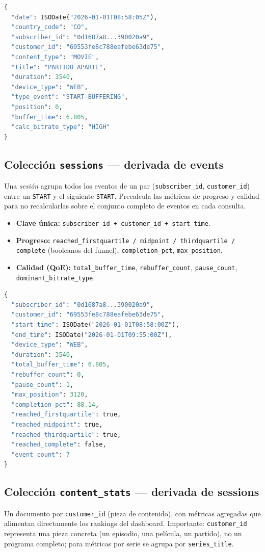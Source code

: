 \documentclass[12pt, letterpaper]{article}
\newcommand{\code}[1]{\texttt{#1}}
\begin{document}
\begin{lstlisting}[language=Python,caption={Documento de ejemplo en \code{events}}]
{
  "date": ISODate("2026-01-01T08:58:05Z"),
  "country_code": "CO",
  "subscriber_id": "0d1687a8...390020a9",
  "customer_id": "69553fe8c788eafebe63de75",
  "content_type": "MOVIE",
  "title": "PARTIDO APARTE",
  "duration": 3540,
  "device_type": "WEB",
  "type_event": "START-BUFFERING",
  "position": 0,
  "buffer_time": 6.805,
  "calc_bitrate_type": "HIGH"
}
\end{lstlisting}

\subsection{Colección \code{sessions} — derivada de events}
Una \emph{sesión} agrupa todos los eventos de un par
(\code{subscriber\_id}, \code{customer\_id}) entre un \code{START} y el
siguiente \code{START}. Precalcula las métricas de progreso y calidad para no
recalcularlas sobre el conjunto completo de eventos en cada consulta.

\begin{itemize}[leftmargin=*]
  \item \textbf{Clave única:} \code{subscriber\_id + customer\_id + start\_time}.
  \item \textbf{Progreso:} \code{reached\_firstquartile / midpoint /
        thirdquartile / complete} (booleanos del funnel), \code{completion\_pct},
        \code{max\_position}.
  \item \textbf{Calidad (QoE):} \code{total\_buffer\_time}, \code{rebuffer\_count},
        \code{pause\_count}, \code{dominant\_bitrate\_type}.
\end{itemize}

\begin{lstlisting}[language=Python,caption={Documento de ejemplo en \code{sessions}}]
{
  "subscriber_id": "0d1687a8...390020a9",
  "customer_id": "69553fe8c788eafebe63de75",
  "start_time": ISODate("2026-01-01T08:58:00Z"),
  "end_time": ISODate("2026-01-01T09:55:00Z"),
  "device_type": "WEB",
  "duration": 3540,
  "total_buffer_time": 6.805,
  "rebuffer_count": 0,
  "pause_count": 1,
  "max_position": 3120,
  "completion_pct": 88.14,
  "reached_firstquartile": true,
  "reached_midpoint": true,
  "reached_thirdquartile": true,
  "reached_complete": false,
  "event_count": 7
}
\end{lstlisting}

\subsection{Colección \code{content\_stats} — derivada de sessions}
Un documento por \code{customer\_id} (pieza de contenido), con métricas
agregadas que alimentan directamente los rankings del dashboard.
Importante: \code{customer\_id} representa una pieza concreta (un episodio, una
película, un partido), no un programa completo; para métricas por serie se
agrupa por \code{series\_title}.
\end{document}
